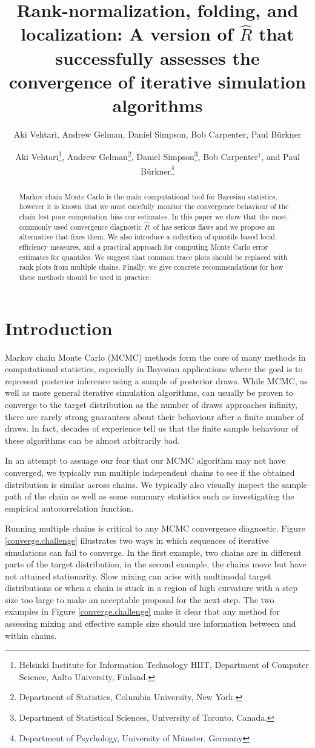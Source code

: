 \documentclass[american,]{article}
\title{Rank-normalization, folding, and localization: A version of $\widehat{R}$ that successfully assesses the convergence of iterative simulation algorithms}
\author{Aki Vehtari, Andrew Gelman, Daniel Simpson, Bob Carpenter, Paul Bürkner}
\author{
Aki Vehtari\footnote{Helsinki Institute for Information Technology HIIT,
  Department of Computer Science, Aalto University, Finland.},
   Andrew Gelman\footnote{Department of Statistics, Columbia University, New York.},
 Daniel Simpson\footnote{Department of Statistical Sciences, University of Toronto, Canada.},
 Bob Carpenter$^{\dagger}$,
and Paul B\"{u}rkner\footnote{Department of Psychology, University of M\"{u}nster, Germany}
}
\newcommand{\Rhat}{$\widehat{R}$}
\begin{document}
\maketitle
\begin{abstract}
  Markov chain Monte Carlo is the main computational tool for Bayesian 
  statistics, however it is known that we must carefully monitor the
  convergence behaviour of the chain lest poor computation bias our estimates.
In this paper we show that the most commonly used convergence diagnostic \Rhat\ 
of \citet{Gelman+Rubin:1992} has serious flaws and we
propose an alternative that fixes them. We also introduce
  a collection of quantile based local efficiency
  measures, and a practical approach for computing Monte Carlo error
  estimates for quantiles. We suggest that common trace plots should
  be replaced with rank plots from multiple chains. Finally, we give
  concrete recommendations for how these methods should be used
  in practice.
\end{abstract}

\hypertarget{introduction}{%
\section{Introduction}\label{introduction}}

 Markov chain Monte Carlo (MCMC) methods form the core
of many methods in computational statistics, especially 
in Bayesian applications where the goal is to represent
posterior inference using a sample of posterior draws. While MCMC, 
as well as more general iterative
simulation algorithms, can usually be proven to converge
to the target distribution as the number of draws approaches infinity,
there are rarely strong guarantees about their behaviour after a 
finite number of draws. In fact, decades of experience tell us that
the finite sample behaviour of these algorithms can be almost arbitrarily bad.


In an attempt to assuage our fear that our MCMC algorithm may
not have converged, we typically run multiple 
independent chains  to see if the obtained 
distribution is similar across chains.  We typically also visually inspect
the sample path of the chain as well as some summary statistics such as
investigating the empirical autocorrelation function. 

Running multiple chains is critical to any MCMC convergence diagnostic. Figure
\ref{converge.challenge} illustrates two ways in which sequences of
iterative simulations can fail to converge.  In the first example, two chains
are in different parts of the target distribution, in the second
example, the chains move but have not attained stationarity. Slow mixing can arise with multimodal target distributions or when a chain is
stuck in a region of high curvature with a step size too large to make an
acceptable proposal for the next step. The two examples in Figure \ref{converge.challenge}  make it clear that 
any method for assessing mixing and effective sample size should use information
between and within chains.
\end{document}
